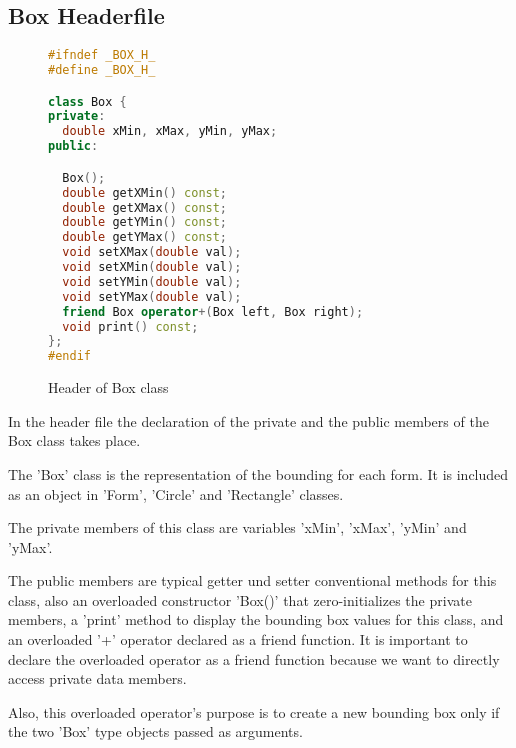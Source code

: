 \documentclass[a4paper, 10pt]{article}
\begin{document}
\subsection{Box Headerfile}
\begin{figure}[H]
\begin{lstlisting}[language=c++]
#ifndef _BOX_H_
#define _BOX_H_

class Box {
private:
  double xMin, xMax, yMin, yMax;
public:

  Box();
  double getXMin() const;
  double getXMax() const;
  double getYMin() const;
  double getYMax() const;
  void setXMax(double val);
  void setXMin(double val);
  void setYMin(double val);
  void setYMax(double val);
  friend Box operator+(Box left, Box right);
  void print() const;
};
#endif
\end{lstlisting}
\caption{Header of Box class}
\end{figure}
In the header file the declaration of the private and the public members of the Box class takes place.

The 'Box' class is the representation of the bounding for each form. It is included as an object in 'Form', 'Circle' and 'Rectangle' classes.

The private members of this class are variables 'xMin', 'xMax', 'yMin' and 'yMax'.

The public members are typical getter und setter conventional methods for this class, also an overloaded constructor 'Box()' that zero-initializes the private members, a 'print' method to display the bounding box values for this class, and an overloaded '+' operator declared as a friend function. It is important to declare the overloaded operator as a friend function because we want to directly access private data members.

Also, this overloaded operator's purpose is to create a new bounding box only if the two 'Box' type objects passed as arguments.
\end{document}
